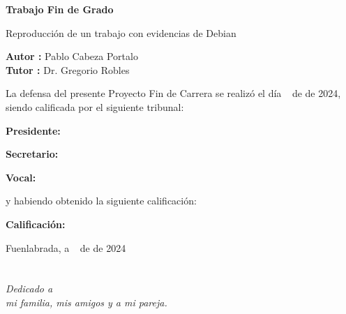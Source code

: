 \documentclass[a4paper, 12pt]{book}
\begin{document}
\vspace{-4cm}
\begin{center}
\LARGE
\textbf{Trabajo Fin de Grado}

\vspace{1cm}
\large
Reproducción de un trabajo con evidencias de Debian

\vspace{1cm}
\large
\textbf{Autor :} Pablo Cabeza Portalo \\
\textbf{Tutor :} Dr. Gregorio Robles

\end{center}

\vspace{1cm}
La defensa del presente Proyecto Fin de Carrera se realizó el día \qquad$\;\,$ de \qquad\qquad\qquad\qquad \newline de 2024, siendo calificada por el siguiente tribunal:


\vspace{0.5cm}
\textbf{Presidente:}

\vspace{1.2cm}
\textbf{Secretario:}

\vspace{1.2cm}
\textbf{Vocal:}


\vspace{1.2cm}
y habiendo obtenido la siguiente calificación:

\vspace{1cm}
\textbf{Calificación:}


\vspace{1cm}
\begin{flushright}
Fuenlabrada, a \qquad$\;\,$ de \qquad\qquad\qquad\qquad de 2024
\end{flushright}


\chapter*{}
\begin{flushright}
\textit{Dedicado a \\
mi familia, mis amigos y a mi pareja.}
\end{flushright}

\end{document}
